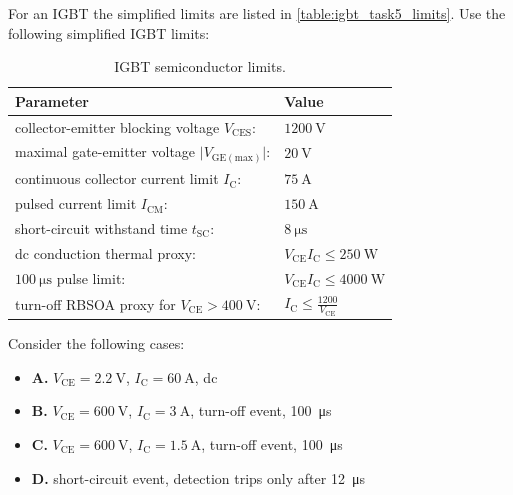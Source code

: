 

For an IGBT the simplified limits are listed in \autoref{table:igbt_task5_limits}.
Use the following simplified IGBT limits:


\begin{table}[ht]
    \centering
    \begin{tabular}{ll}
        \toprule
        Parameter  & Value \\
        \midrule
        collector-emitter blocking voltage $V_\mathrm{CES}$: & $\SI{1200}{\volt}$ \\
        maximal gate-emitter voltage $\lvert V_\mathrm{GE(max)} \rvert$: & $\SI{20}{\volt}$ \\
        continuous collector current limit $I_\mathrm{C}$: & $\SI{75}{\ampere}$\\
        pulsed current limit $I_\mathrm{CM}$: & $\SI{150}{\ampere}$ \\
        short-circuit withstand time $t_\mathrm{SC}$: & $\SI{8}{\micro\second}$ \\
        dc conduction thermal proxy: & $V_\mathrm{CE} I_\mathrm{C} \leq \SI{250}{\watt}$ \\
        $\SI{100}{\micro\second}$ pulse limit: & $V_\mathrm{CE} I_\mathrm{C} \leq \SI{4000}{\watt}$ \\
        turn-off RBSOA proxy for $V_\mathrm{CE} > \SI{400}{\volt}$: & $I_\mathrm{C} \leq \frac{1200}{V_\mathrm{CE}}$ \\
        \bottomrule
    \end{tabular}
    \caption{IGBT semiconductor limits.}
    \label{table:igbt_task5_limits}
\end{table}

\FloatBarrier

Consider the following cases:
\begin{itemize}
    \setlength{\itemsep}{-2pt} %
    \setlength{\parskip}{-2pt} %
    \item \textbf{A.} $V_\mathrm{CE} = \SI{2.2}{\volt}$, $I_\mathrm{C} = \SI{60}{\ampere}$, dc
    \item \textbf{B.} $V_\mathrm{CE} = \SI{600}{\volt}$, $I_\mathrm{C} = \SI{3}{\ampere}$, turn-off event, \SI{100}{\micro\second}
    \item \textbf{C.} $V_\mathrm{CE} = \SI{600}{\volt}$, $I_\mathrm{C} = \SI{1.5}{\ampere}$, turn-off event, \SI{100}{\micro\second}
    \item \textbf{D.} short-circuit event, detection trips only after \SI{12}{\micro\second}
\end{itemize}

